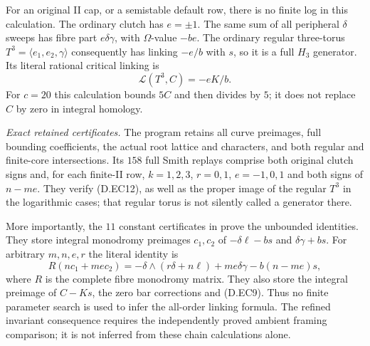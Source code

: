 For an original II cap, or a semistable default
row, there is no finite log in this calculation.
The ordinary clutch has $e=\pm1$. The same sum
of all peripheral $\delta$ sweeps has fibre part
$e\delta\gamma$, with $\Omega$-value $-be$.
The ordinary regular three-torus
$T^3=\langle e_1,e_2,\gamma\rangle$ consequently
has linking $-e/b$ with $s$, so it is a full
$H_3$ generator. Its literal rational critical
linking is
\[
                           \mathcal L(T^3,C)=-eK/b.        \tag{D.EC14}
\]
For $c=20$ this calculation bounds $5C$ and then
divides by $5$; it does not replace $C$ by zero
in integral homology.

\emph{Exact retained certificates.}
The program 
retains all curve preimages, full bounding coefficients,
the actual root lattice and characters, and both regular
and finite-core intersections. Its $158$ full Smith
replays comprise both original clutch signs and, for
each finite-II row, $k=1,2,3$, $r=0,1$, $e=-1,0,1$ and
both signs of $n-me$. They verify (D.EC12), as well as
the proper image of the regular $T^3$ in the logarithmic
cases; that regular torus is not silently called a
generator there.

More importantly, the $11$ constant certificates in
prove the unbounded identities. They store integral
monodromy preimages $c_1,c_2$ of
$-\delta\ell-bs$ and $\delta\gamma+bs$.
For arbitrary $m,n,e,r$ the literal identity is
\[
 R(nc_1+me c_2)=
 -\delta\wedge(r\delta+n\ell)+me\delta\gamma
                                  -b(n-me)s,
\]
where $R$ is the complete fibre monodromy matrix.
They also store the integral preimage of $C-Ks$,
the zero bar corrections and (D.EC9). Thus no
finite parameter search is used to infer the
all-order linking formula. The refined invariant
consequence requires the independently proved
ambient framing comparison; it is not inferred
from these chain calculations alone.
